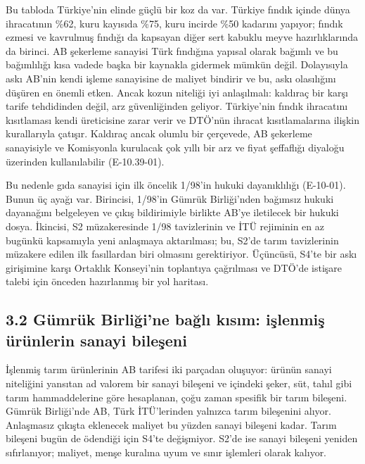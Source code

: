 Bu tabloda Türkiye'nin elinde güçlü bir koz da var. Türkiye fındık içinde dünya ihracatının \%62, kuru kayısıda \%75, kuru incirde \%50 kadarını yapıyor; fındık ezmesi ve kavrulmuş fındığı da kapsayan diğer sert kabuklu meyve hazırlıklarında da birinci. AB şekerleme sanayisi Türk fındığına yapısal olarak bağımlı ve bu bağımlılığı kısa vadede başka bir kaynakla gidermek mümkün değil. Dolayısıyla askı AB'nin kendi işleme sanayisine de maliyet bindirir ve bu, askı olasılığını düşüren en önemli etken. Ancak kozun niteliği iyi anlaşılmalı: kaldıraç bir karşı tarife tehdidinden değil, arz güvenliğinden geliyor. Türkiye'nin fındık ihracatını kısıtlaması kendi üreticisine zarar verir ve DTÖ'nün ihracat kısıtlamalarına ilişkin kurallarıyla çatışır. Kaldıraç ancak olumlu bir çerçevede, AB şekerleme sanayisiyle ve Komisyonla kurulacak çok yıllı bir arz ve fiyat şeffaflığı diyaloğu üzerinden kullanılabilir (E-10.39-01).

Bu nedenle gıda sanayisi için ilk öncelik 1/98'in hukuki dayanıklılığı (E-10-01). Bunun üç ayağı var. Birincisi, 1/98'in Gümrük Birliği'nden bağımsız hukuki dayanağını belgeleyen ve çıkış bildirimiyle birlikte AB'ye iletilecek bir hukuki dosya. İkincisi, S2 müzakeresinde 1/98 tavizlerinin ve İTÜ rejiminin en az bugünkü kapsamıyla yeni anlaşmaya aktarılması; bu, S2'de tarım tavizlerinin müzakere edilen ilk fasıllardan biri olmasını gerektiriyor. Üçüncüsü, S4'te bir askı girişimine karşı Ortaklık Konseyi'nin toplantıya çağrılması ve DTÖ'de istişare talebi için önceden hazırlanmış bir yol haritası.

\hypertarget{nace_kartlar_10-12-32-guxfcmruxfck-birliux11fine-baux11flux131-kux131sux131m-iux15flenmiux15f-uxfcruxfcnlerin-sanayi-bileux15feni}{%
\subsection{3.2 Gümrük Birliği'ne bağlı kısım: işlenmiş ürünlerin sanayi bileşeni}\label{nace_kartlar_10-12-32-guxfcmruxfck-birliux11fine-baux11flux131-kux131sux131m-iux15flenmiux15f-uxfcruxfcnlerin-sanayi-bileux15feni}}

İşlenmiş tarım ürünlerinin AB tarifesi iki parçadan oluşuyor: ürünün sanayi niteliğini yansıtan ad valorem bir sanayi bileşeni ve içindeki şeker, süt, tahıl gibi tarım hammaddelerine göre hesaplanan, çoğu zaman spesifik bir tarım bileşeni. Gümrük Birliği'nde AB, Türk İTÜ'lerinden yalnızca tarım bileşenini alıyor. Anlaşmasız çıkışta eklenecek maliyet bu yüzden sanayi bileşeni kadar. Tarım bileşeni bugün de ödendiği için S4'te değişmiyor. S2'de ise sanayi bileşeni yeniden sıfırlanıyor; maliyet, menşe kuralına uyum ve sınır işlemleri olarak kalıyor.

